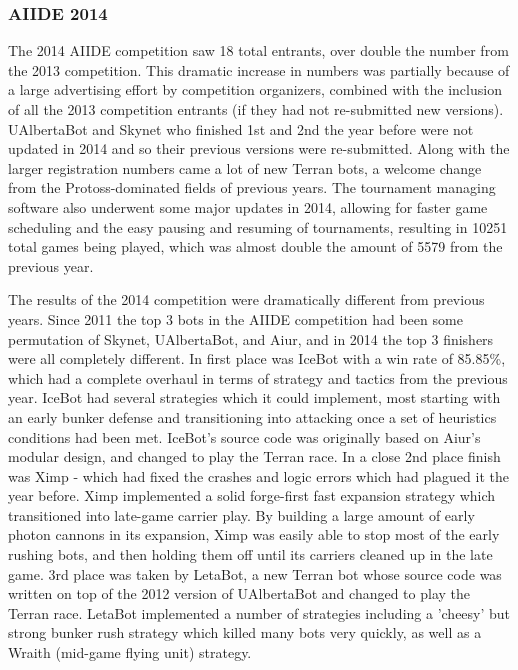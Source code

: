 \documentclass{llncs}
\begin{document}
\subsubsection{AIIDE 2014}

The 2014 AIIDE competition saw 18 total entrants, over double the number from the 2013 competition. This dramatic increase in numbers was partially because of a large advertising effort by competition organizers, combined with the inclusion of all the 2013 competition entrants (if they had not re-submitted new versions). UAlbertaBot and Skynet who finished 1st and 2nd the year before were not updated in 2014 and so their previous versions were re-submitted. Along with the larger registration numbers came a lot of new Terran bots, a welcome change from the Protoss-dominated fields of previous years. The tournament managing software also underwent some major updates in 2014, allowing for faster game scheduling and the easy pausing and resuming of tournaments, resulting in 10251 total games being played, which was almost double the amount of 5579 from the previous year.

The results of the 2014 competition were dramatically different from previous years. Since 2011 the top 3 bots in the AIIDE competition had been some permutation of Skynet, UAlbertaBot, and Aiur, and in 2014 the top 3 finishers were all completely different. In first place was IceBot with a win rate of 85.85\%, which had a complete overhaul in terms of strategy and tactics from the previous year. IceBot had several strategies which it could implement, most starting with an early bunker defense and transitioning into attacking once a set of heuristics conditions had been met. IceBot's source code was originally based on Aiur's modular design, and changed to play the Terran race. In a close 2nd place finish was Ximp - which had fixed the crashes and logic errors which had plagued it the year before. Ximp implemented a solid forge-first fast expansion strategy which transitioned into late-game carrier play. By building a large amount of early photon cannons in its expansion, Ximp was easily able to stop most of the early rushing bots, and then holding them off until its carriers cleaned up in the late game. 3rd place was taken by LetaBot, a new Terran bot whose source code was written on top of the 2012 version of UAlbertaBot and changed to play the Terran race. LetaBot implemented a number of strategies including a 'cheesy' but strong bunker rush strategy which killed many bots very quickly, as well as a Wraith (mid-game flying unit) strategy. 
\end{document}
